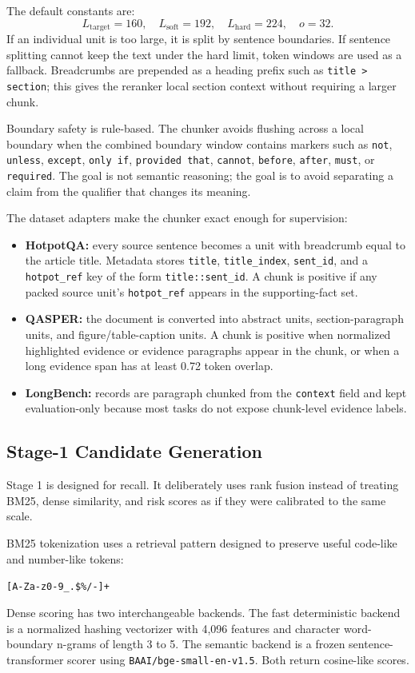 \documentclass[10pt,twocolumn]{article}
\begin{document}
The default constants are:
\[
L_{\mathrm{target}}=160,\quad L_{\mathrm{soft}}=192,\quad L_{\mathrm{hard}}=224,\quad o=32.
\]
If an individual unit is too large, it is split by sentence boundaries. If sentence splitting cannot keep the text under the hard limit, token windows are used as a fallback. Breadcrumbs are prepended as a heading prefix such as \texttt{title > section}; this gives the reranker local section context without requiring a larger chunk.

Boundary safety is rule-based. The chunker avoids flushing across a local boundary when the combined boundary window contains markers such as \texttt{not}, \texttt{unless}, \texttt{except}, \texttt{only if}, \texttt{provided that}, \texttt{cannot}, \texttt{before}, \texttt{after}, \texttt{must}, or \texttt{required}. The goal is not semantic reasoning; the goal is to avoid separating a claim from the qualifier that changes its meaning.

The dataset adapters make the chunker exact enough for supervision:
\begin{itemize}
\item \textbf{HotpotQA:} every source sentence becomes a unit with breadcrumb equal to the article title. Metadata stores \texttt{title}, \texttt{title\_index}, \texttt{sent\_id}, and a \texttt{hotpot\_ref} key of the form \texttt{title::sent\_id}. A chunk is positive if any packed source unit's \texttt{hotpot\_ref} appears in the supporting-fact set.
\item \textbf{QASPER:} the document is converted into abstract units, section-paragraph units, and figure/table-caption units. A chunk is positive when normalized highlighted evidence or evidence paragraphs appear in the chunk, or when a long evidence span has at least 0.72 token overlap.
\item \textbf{LongBench:} records are paragraph chunked from the \texttt{context} field and kept evaluation-only because most tasks do not expose chunk-level evidence labels.
\end{itemize}

\subsection{Stage-1 Candidate Generation}
Stage 1 is designed for recall. It deliberately uses rank fusion instead of treating BM25, dense similarity, and risk scores as if they were calibrated to the same scale.

BM25 tokenization uses a retrieval pattern designed to preserve useful code-like and number-like tokens:
\begin{center}
\small\verb|[A-Za-z0-9_.$%/-]+|
\end{center}
Dense scoring has two interchangeable backends. The fast deterministic backend is a normalized hashing vectorizer with 4,096 features and character word-boundary n-grams of length 3 to 5. The semantic backend is a frozen sentence-transformer scorer using \texttt{BAAI/bge-small-en-v1.5}. Both return cosine-like scores.
\end{document}
